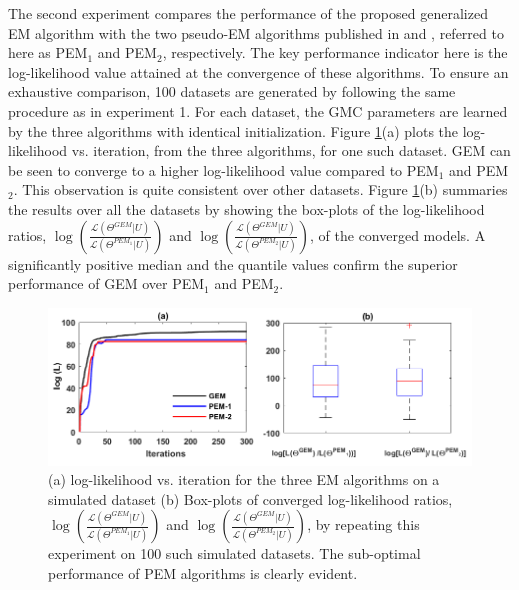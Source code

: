 \documentclass{article}
\theoremstyle{plain}
\theoremstyle{definition}
\theoremstyle{remark}
\begin{document}
The second experiment compares the performance of the proposed generalized EM algorithm with the two pseudo-EM algorithms published in \citet{Bhattacharya2014} and \citet{Tewari2011}, referred to here as PEM$_1$ and PEM$_2$, respectively. The key performance indicator here is the log-likelihood value attained at the convergence of these algorithms. To ensure an exhaustive comparison, 100 datasets are generated by following the same procedure as in experiment 1. For each dataset, the GMC parameters are learned by the three algorithms with identical initialization. Figure \ref{fig:EM_algo_comp}(a) plots the log-likelihood vs. iteration, from the three algorithms, for one such dataset. GEM can be seen to converge to a higher log-likelihood value compared to PEM$_1$ and PEM$_2$. This observation is quite consistent over other datasets. Figure \ref{fig:EM_algo_comp}(b) summaries the results over all the datasets by showing the box-plots of the log-likelihood ratios, $\log\left( \frac{\mathcal{L}\left(\Theta^{GEM}|U\right)}{\mathcal{L}\left(\Theta^{PEM_1}|U\right)}\right)$ and $\log\left( \frac{\mathcal{L}\left(\Theta^{GEM}|U\right)}{\mathcal{L}\left(\Theta^{PEM_2}|U\right)}\right)$, of the converged models. A significantly positive median and the quantile values confirm the superior performance of GEM over PEM$_1$ and PEM$_2$.
\begin{figure}[ht]
\vskip 0.2in
\begin{center}
\centerline{\includegraphics[width=\columnwidth,keepaspectratio=true]{figures/EM_algo_comparisons}}
\caption{(a) log-likelihood vs. iteration for the three EM algorithms on a simulated dataset (b) Box-plots of converged log-likelihood ratios,  $\log\left( \frac{\mathcal{L}\left(\Theta^{GEM}|U\right)}{\mathcal{L}\left(\Theta^{PEM_1}|U\right)}\right)$ and $\log\left( \frac{\mathcal{L}\left(\Theta^{GEM}|U\right)}{\mathcal{L}\left(\Theta^{PEM_2}|U\right)}\right)$, by repeating this experiment on 100 such simulated datasets. The sub-optimal performance of PEM algorithms is clearly evident.}
\label{fig:EM_algo_comp}
\end{center}
\vskip -0.2in
\end{figure}  
\end{document}
